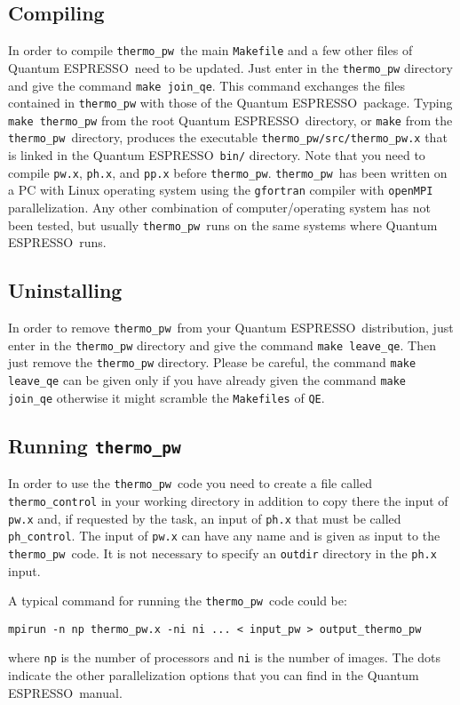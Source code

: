 \documentclass[12pt,a4paper]{article}
\def\qe{{\sc Quantum ESPRESSO}}
\def\thermo{\texttt{thermo\_pw}}
\begin{document}
\subsection{Compiling}

In order to compile \thermo\ the main \texttt{Makefile} and a few other
files of \qe\ need to be updated. Just enter in the \texttt{thermo\_pw}
directory and give the command \texttt{make join\_qe}. This command exchanges
the files contained in \texttt{thermo\_pw} with those of the \qe\ package.
Typing \texttt{make thermo\_pw} from the root \qe\ directory, or \texttt{make} 
from the \texttt{thermo\_pw}\ directory, produces the executable
\texttt{thermo\_pw/src/thermo\_pw.x} that is linked in the 
\qe\ \texttt{bin/} directory. Note that you need to compile \texttt{pw.x},
\texttt{ph.x}, and \texttt{pp.x} before \texttt{thermo\_pw}.
\thermo\ has been written on a PC with Linux operating system using the
\texttt{gfortran} compiler with \texttt{openMPI} parallelization. Any other
combination of computer/operating system has not been tested, but usually
\thermo\ runs on the same systems where \qe\ runs.

\subsection{Uninstalling}

In order to remove \thermo\ from your \qe\ distribution, just enter in the
\texttt{thermo\_pw} directory and give the command \texttt{make leave\_qe}.
Then just remove the \texttt{thermo\_pw} directory. Please be careful, the
command \texttt{make leave\_qe} can be given only if you have already
given the command \texttt{make join\_qe} otherwise it might scramble the
\texttt{Makefiles} of \texttt{QE}.

\subsection{Running \thermo}

In order to use the \thermo\ code you need to create a file called
\texttt{thermo\_control} in your working directory in addition to copy
there the input of \texttt{pw.x} and, if requested by the task, an
input of \texttt{ph.x} that must be called \texttt{ph\_control}.
The input of \texttt{pw.x} can have any name and is given as input to
the \thermo\ code. It is not necessary to specify an \texttt{outdir} 
directory in the \texttt{ph.x} input.

A typical command for running the \thermo\ code could be:
\begin{verbatim}
mpirun -n np thermo_pw.x -ni ni ... < input_pw > output_thermo_pw
\end{verbatim}
where \texttt{np} is the number of processors and \texttt{ni} is the number 
of images. The dots indicate the other parallelization options that
you can find in the \qe\ manual.
\end{document}
